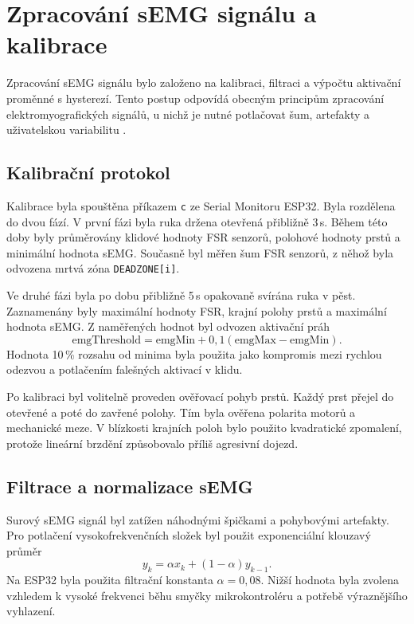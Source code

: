 \section{Zpracování sEMG signálu a kalibrace}
\label{sec:semg-zpracovani}

Zpracování sEMG signálu bylo založeno na kalibraci, filtraci a výpočtu aktivační proměnné s hysterezí. Tento postup odpovídá obecným principům zpracování elektromyografických signálů, u nichž je nutné potlačovat šum, artefakty a uživatelskou variabilitu \cite{DeLuca2010,Reaz2006,Chowdhury2013917}.

\subsection{Kalibrační protokol}
\label{subsec:kalibracni-protokol}

Kalibrace byla spouštěna příkazem \texttt{c} ze Serial Monitoru ESP32. Byla rozdělena do dvou fází. V první fázi byla ruka držena otevřená přibližně 3\,s. Během této doby byly průměrovány klidové hodnoty FSR senzorů, polohové hodnoty prstů a minimální hodnota sEMG\@. Současně byl měřen šum FSR senzorů, z něhož byla odvozena mrtvá zóna \texttt{DEADZONE[i]}.

Ve druhé fázi byla po dobu přibližně 5\,s opakovaně svírána ruka v pěst. Zaznamenány byly maximální hodnoty FSR, krajní polohy prstů a maximální hodnota sEMG\@. Z naměřených hodnot byl odvozen aktivační práh
\begin{equation}
    \mathrm{emgThreshold} =
    \mathrm{emgMin} + 0{,}1\left(\mathrm{emgMax} - \mathrm{emgMin}\right).
\end{equation}
Hodnota 10\,\% rozsahu od minima byla použita jako kompromis mezi rychlou odezvou a potlačením falešných aktivací v klidu.

Po kalibraci byl volitelně proveden ověřovací pohyb prstů. Každý prst přejel do otevřené a poté do zavřené polohy. Tím byla ověřena polarita motorů a mechanické meze. V blízkosti krajních poloh bylo použito kvadratické zpomalení, protože lineární brzdění způsobovalo příliš agresivní dojezd.

\subsection{Filtrace a normalizace sEMG}
\label{subsec:filtrace-semgg}

Surový sEMG signál byl zatížen náhodnými špičkami a pohybovými artefakty. Pro potlačení vysokofrekvenčních složek byl použit exponenciální klouzavý průměr
\begin{equation}
    y_k = \alpha x_k + \left(1 - \alpha\right)y_{k-1}.
\end{equation}
Na ESP32 byla použita filtrační konstanta $\alpha = 0{,}08$. Nižší hodnota byla zvolena vzhledem k vysoké frekvenci běhu smyčky mikrokontroléru a potřebě výraznějšího vyhlazení.

